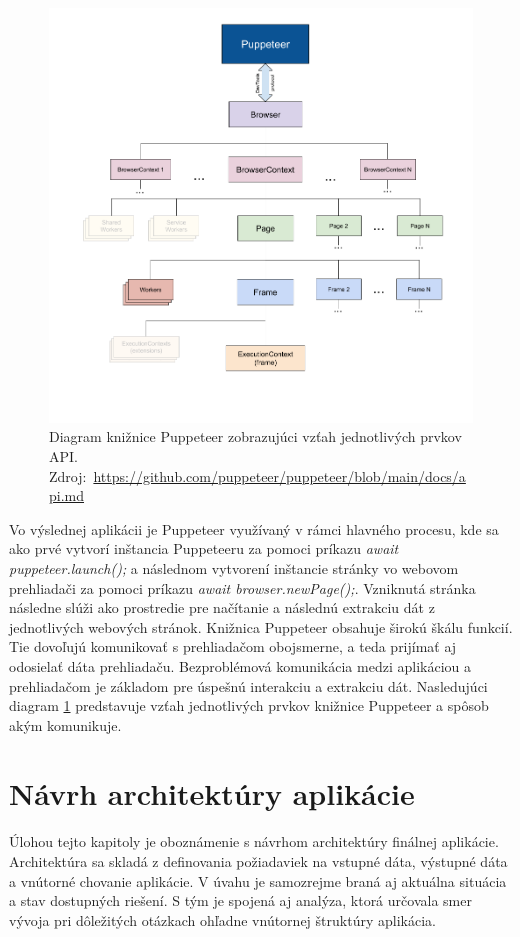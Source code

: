 \begin{figure}[hbt]
	\centering
	\includegraphics[width=1\textwidth]{obrazky-figures/diagram.png}
	\caption{Diagram knižnice Puppeteer zobrazujúci vzťah jednotlivých prvkov API.\\ \mbox{Zdroj: \url{https://github.com/puppeteer/puppeteer/blob/main/docs/api.md}}}
	\label{diagram}
\end{figure}

Vo výslednej aplikácii je Puppeteer využívaný v rámci hlavného procesu, kde sa ako prvé vytvorí inštancia Puppeteeru za pomoci príkazu \textit{await puppeteer.launch();} a následnom vytvorení inštancie stránky vo webovom prehliadači za pomoci príkazu \textit{await browser.newPage();}. Vzniknutá stránka následne slúži ako prostredie pre načítanie a následnú extrakciu dát z jednotlivých webových stránok. Knižnica Puppeteer obsahuje širokú škálu funkcií. Tie dovoľujú komunikovať s prehliadačom obojsmerne, a teda prijímať aj odosielať dáta prehliadaču. Bezproblémová komunikácia medzi aplikáciou a prehliadačom je základom pre úspešnú interakciu a extrakciu dát. Nasledujúci diagram \ref{diagram} predstavuje vzťah jednotlivých prvkov knižnice Puppeteer a spôsob akým komunikuje.

\chapter{Návrh architektúry aplikácie}
\label{Navrh}
Úlohou tejto kapitoly je oboznámenie s návrhom architektúry finálnej aplikácie. Architektúra sa skladá z definovania požiadaviek na vstupné dáta, výstupné dáta a vnútorné chovanie aplikácie. V úvahu je samozrejme braná aj aktuálna situácia a stav dostupných riešení.  S tým je spojená aj analýza, ktorá určovala smer vývoja pri dôležitých otázkach ohľadne vnútornej štruktúry aplikácia.

